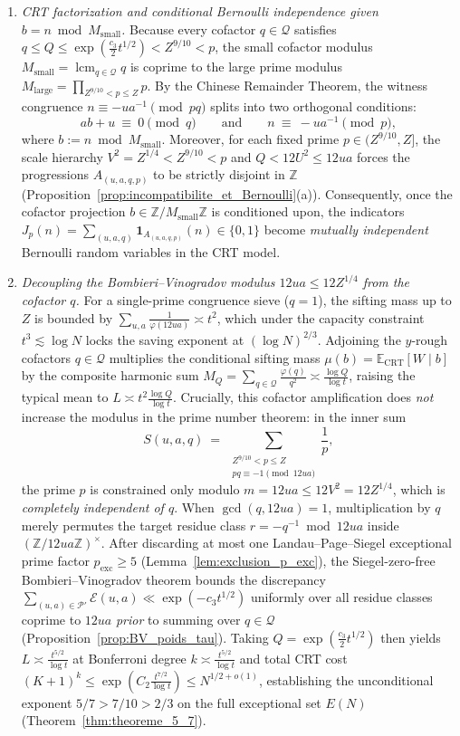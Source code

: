 \documentclass[11pt, a4paper]{article}
\theoremstyle{plain}
\theoremstyle{definition}
\newcommand{\Z}{\mathbb{Z}}
\newcommand{\Ebb}{\mathbb{E}}
\newcommand{\ind}{\mathbf{1}}
\begin{document}
\begin{enumerate}[1.]
    \item \emph{CRT factorization and conditional Bernoulli independence given $b=n\bmod M_{\mathrm{small}}$.} Because every cofactor $q\in\mathcal{Q}$ satisfies $q\le Q\le\exp(\frac{c_3}{2}t^{1/2})<Z^{9/10}<p$, the small cofactor modulus $M_{\mathrm{small}}=\operatorname{lcm}_{q\in\mathcal{Q}}q$ is coprime to the large prime modulus $M_{\mathrm{large}}=\prod_{Z^{9/10}<p\le Z}p$. By the Chinese Remainder Theorem, the witness congruence $n\equiv -ua^{-1}\pmod{pq}$ splits into two orthogonal conditions:
    $$ab+u\ \equiv\ 0\pmod q\qquad\text{and}\qquad n\ \equiv\ -ua^{-1}\pmod p,$$
    where $b:=n\bmod M_{\mathrm{small}}$. Moreover, for each fixed prime $p\in(Z^{9/10},Z]$, the scale hierarchy $V^{2}=Z^{1/4}<Z^{9/10}<p$ and $Q<12U^{2}\le 12ua$ forces the progressions $A_{(u,a,q,p)}$ to be strictly disjoint in $\Z$ (Proposition~\ref{prop:incompatibilite_et_Bernoulli}(a)). Consequently, once the cofactor projection $b\in\Z/M_{\mathrm{small}}\Z$ is conditioned upon, the indicators $J_p(n)=\sum_{(u,a,q)}\ind_{A_{(u,a,q,p)}}(n)\in\{0,1\}$ become \emph{mutually independent} Bernoulli random variables in the CRT model.
    \item \emph{Decoupling the Bombieri--Vinogradov modulus $12ua\le 12Z^{1/4}$ from the cofactor $q$.} For a single-prime congruence sieve ($q=1$), the sifting mass up to $Z$ is bounded by $\sum_{u,a}\frac{1}{\varphi(12ua)}\asymp t^{2}$, which under the capacity constraint $t^{3}\lesssim\log N$ locks the saving exponent at $(\log N)^{2/3}$. Adjoining the $y$-rough cofactors $q\in\mathcal{Q}$ multiplies the conditional sifting mass $\mu(b)=\Ebb_{\mathrm{CRT}}[W\mid b]$ by the composite harmonic sum $M_Q=\sum_{q\in\mathcal{Q}}\frac{\varphi(q)}{q^{2}}\asymp\frac{\log Q}{\log t}$, raising the typical mean to $L\asymp t^{2}\frac{\log Q}{\log t}$. Crucially, this cofactor amplification does \emph{not} increase the modulus in the prime number theorem: in the inner sum
    $$S(u,a,q)\ =\ \sum_{\substack{Z^{9/10}<p\le Z\\ pq\equiv -1\pmod{12ua}}}\frac{1}{p},$$
    the prime $p$ is constrained only modulo $m=12ua\le 12V^{2}=12Z^{1/4}$, which is \emph{completely independent of $q$}. When $\gcd(q,12ua)=1$, multiplication by $q$ merely permutes the target residue class $r=-q^{-1}\bmod{12ua}$ inside $(\Z/12ua\Z)^{\times}$. After discarding at most one Landau--Page--Siegel exceptional prime factor $p_{\mathrm{exc}}\ge 5$ (Lemma~\ref{lem:exclusion_p_exc}), the Siegel-zero-free Bombieri--Vinogradov theorem bounds the discrepancy $\sum_{(u,a)\in\mathcal{P}'}\mathcal{E}(u,a)\ll\exp(-c_3 t^{1/2})$ uniformly over all residue classes coprime to $12ua$ \emph{prior} to summing over $q\in\mathcal{Q}$ (Proposition~\ref{prop:BV_poids_tau}). Taking $Q=\exp(\frac{c_3}{2}t^{1/2})$ then yields $L\asymp\frac{t^{5/2}}{\log t}$ at Bonferroni degree $k\asymp\frac{t^{5/2}}{\log t}$ and total CRT cost $(K+1)^{k}\le\exp(C_2\frac{t^{7/2}}{\log t})\le N^{1/2+o(1)}$, establishing the unconditional exponent $5/7>7/10>2/3$ on the full exceptional set $E(N)$ (Theorem~\ref{thm:theoreme_5_7}).
\end{enumerate}
\end{document}

